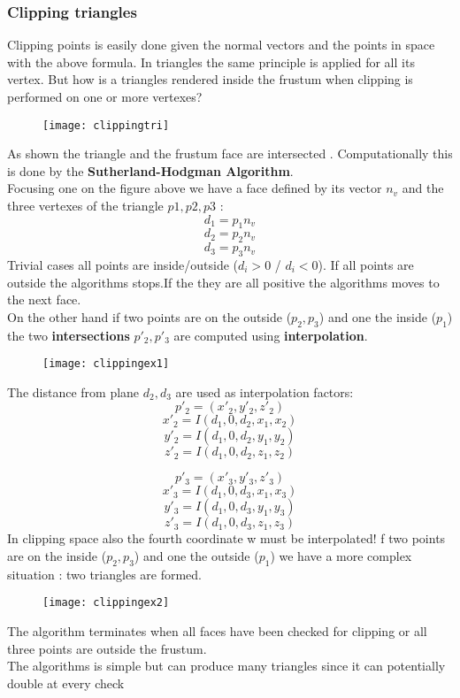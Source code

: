 \subsubsection{Clipping triangles}
Clipping points is easily done given the normal vectors and the points in space with the above formula. In triangles the same principle is applied for all its vertex. But how is a triangles rendered inside the frustum when clipping is performed on one or more vertexes?
\begin{figure}[H]
  \centering
  \texttt{[image: clippingtri]}
\end{figure}
As shown the triangle and the frustum face are intersected . Computationally this is done by the \textbf{Sutherland-Hodgman Algorithm}.\\
Focusing one on the figure above we have a face defined by its vector $n_v$ and the three vertexes of the triangle $p1,p2,p3$ : 
$$ d_1 = p_1n_v $$
$$ d_2 = p_2n_v $$
$$ d_3 = p_3n_v $$
Trivial cases all points are inside/outside ($d_i >0$ / $d_i<0$). If all points are outside the algorithms stops.If the they are all positive the algorithms moves to the next face.\\
On the other hand if two points are on the outside ($p_2,p_3$) and one the inside ($p_1$) the two \textbf{intersections} $p'_2,p'_3$ are computed using \textbf{interpolation}. 
\begin{figure}[H]
  \centering
  \texttt{[image: clippingex1]}
\end{figure}
The distance from plane $d_2,d_3$ are used as interpolation factors: 
$$ p'_2= (x'_2,y'_2,z'_2)$$
$$ x'_2 = I(d_1,0,d_2,x_1,x_2)$$
$$ y'_2 = I(d_1,0,d_2,y_1,y_2)$$
$$ z'_2 = I(d_1,0,d_2,z_1,z_2)$$

$$ p'_3= (x'_3,y'_3,z'_3)$$
$$ x'_3 = I(d_1,0,d_3,x_1,x_3)$$
$$ y'_3 = I(d_1,0,d_3,y_1,y_3)$$
$$ z'_3 = I(d_1,0,d_3,z_1,z_3)$$
In clipping space also the fourth coordinate w must be interpolated!
f two points are on the inside ($p_2,p_3$) and one the outside ($p_1$) we have a more complex situation : two triangles are formed.
\begin{figure}[H]
  \centering
  \texttt{[image: clippingex2]}
\end{figure}
The algorithm terminates when all faces have been checked for clipping or all three points are outside the frustum.\\
The algorithms is simple but can produce many triangles since it can potentially double at every check